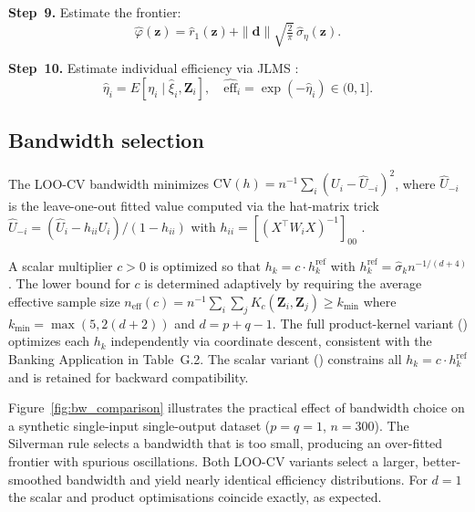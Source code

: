 \documentclass[article]{jss}
\begin{document}
\textbf{Step~9.} Estimate the frontier:
%
\begin{equation}
  \hat{\varphi}(\mathbf{z}) = \hat{r}_1(\mathbf{z})
  + \|\mathbf{d}\|\sqrt{\tfrac{2}{\pi}}\,\hat{\sigma}_\eta(\mathbf{z}).
  \label{eq:frontier}
\end{equation}

\textbf{Step~10.} Estimate individual efficiency via JLMS
\citep{JondrowEtAl1982}:
%
\begin{equation}
  \hat{\eta}_i = E[\eta_i \mid \hat{\xi}_i, \mathbf{Z}_i], \quad
  \widehat{\mathrm{eff}}_i = \exp(-\hat{\eta}_i) \in (0,1].
\end{equation}

\subsection{Bandwidth selection}
\label{sec:bandwidth}

The LOO-CV bandwidth minimizes
$\mathrm{CV}(h) = n^{-1}\sum_i (U_i - \hat{U}_{-i})^2$,
where $\hat{U}_{-i}$ is the leave-one-out fitted value computed via
the hat-matrix trick
$\hat{U}_{-i} = (\hat{U}_i - h_{ii}U_i)/(1-h_{ii})$
with $h_{ii} = [(X^\top W_i X)^{-1}]_{00}$
\citep{FanGijbels1996}.

A scalar multiplier $c > 0$ is optimized so that
$h_k = c \cdot h_k^{\mathrm{ref}}$ with
$h_k^{\mathrm{ref}} = \hat{\sigma}_k n^{-1/(d+4)}$.
The lower bound for $c$ is determined adaptively by requiring the
average effective sample size
$n_{\mathrm{eff}}(c) = n^{-1}\sum_i\sum_j K_c(\mathbf{Z}_i,\mathbf{Z}_j)
\geq k_{\min}$
where $k_{\min} = \max(5, 2(d+2))$ and $d = p+q-1$.
The full product-kernel variant ()
optimizes each $h_k$ independently via coordinate descent,
consistent with the Banking Application in \citet{SimarWilson2023}
Table~G.2.
The scalar variant ()
constrains all $h_k = c \cdot h_k^{\mathrm{ref}}$ and is retained
for backward compatibility.

Figure~\ref{fig:bw_comparison} illustrates the practical effect of
bandwidth choice on a synthetic single-input single-output dataset
($p=q=1$, $n=300$).
The Silverman rule selects a bandwidth that is too small, producing
an over-fitted frontier with spurious oscillations.
Both LOO-CV variants select a larger, better-smoothed bandwidth and
yield nearly identical efficiency distributions.
For $d=1$ the scalar and product optimisations coincide exactly, as
expected.
\end{document}
